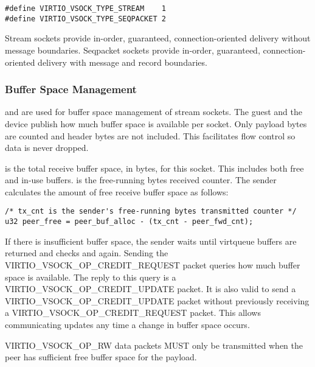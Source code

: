 \begin{lstlisting}
#define VIRTIO_VSOCK_TYPE_STREAM    1
#define VIRTIO_VSOCK_TYPE_SEQPACKET 2
\end{lstlisting}

Stream sockets provide in-order, guaranteed, connection-oriented delivery
without message boundaries. Seqpacket sockets provide in-order, guaranteed,
connection-oriented delivery with message and record boundaries.

\subsubsection{Buffer Space Management}\label{sec:Device Types / Socket Device / Device Operation / Buffer Space Management}
 and  are used for buffer space management of
stream sockets. The guest and the device publish how much buffer space is
available per socket. Only payload bytes are counted and header bytes are not
included. This facilitates flow control so data is never dropped.

 is the total receive buffer space, in bytes, for this socket.
This includes both free and in-use buffers.  is the free-running
bytes received counter. The sender calculates the amount of free receive buffer
space as follows:

\begin{lstlisting}
/* tx_cnt is the sender's free-running bytes transmitted counter */
u32 peer_free = peer_buf_alloc - (tx_cnt - peer_fwd_cnt);
\end{lstlisting}

If there is insufficient buffer space, the sender waits until virtqueue buffers
are returned and checks  and  again. Sending
the VIRTIO_VSOCK_OP_CREDIT_REQUEST packet queries how much buffer space is
available. The reply to this query is a VIRTIO_VSOCK_OP_CREDIT_UPDATE packet.
It is also valid to send a VIRTIO_VSOCK_OP_CREDIT_UPDATE packet without
previously receiving a VIRTIO_VSOCK_OP_CREDIT_REQUEST packet. This allows
communicating updates any time a change in buffer space occurs.

VIRTIO_VSOCK_OP_RW data packets MUST only be transmitted when the peer has
sufficient free buffer space for the payload.

